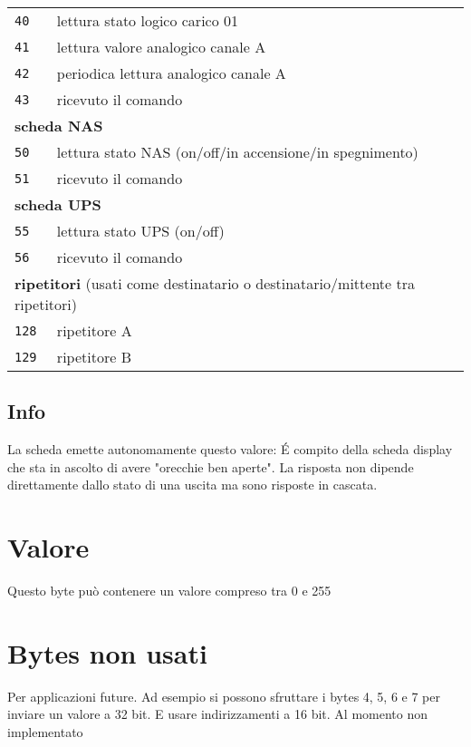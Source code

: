 \documentclass{article}
\begin{document}
\begin{tabular}{ll}
		    \texttt{40} & lettura stato logico carico 01\\ 
		    \texttt{41} & lettura valore analogico canale A\\
		    \texttt{42} & periodica lettura analogico canale A\\
			\texttt{43} & ricevuto il comando\\
			\multicolumn{2}{l}{\textbf{scheda NAS}}\\
			\texttt{50} & lettura stato NAS (on/off/in accensione/in spegnimento)\\
			\texttt{51} & ricevuto il comando\\
			\multicolumn{2}{l}{\textbf{scheda UPS}}\\
			\texttt{55} & lettura stato UPS (on/off)\\
			\texttt{56} & ricevuto il comando\\
			\multicolumn{2}{l}{\textbf{ripetitori} (usati come destinatario o destinatario/mittente tra ripetitori)}\\
			\texttt{128} & ripetitore A\\    
			\texttt{129} & ripetitore B\\ 
        \end{tabular}

    \subsection*{Info}
    
    La scheda emette autonomamente questo valore: \'E compito della scheda display che sta in ascolto di avere "orecchie ben aperte". La risposta non dipende direttamente dallo stato di una uscita ma sono risposte in cascata.
    
    \section*{Valore}
    
    Questo byte può contenere un valore compreso tra 0 e 255
    
    \section*{Bytes non usati}
    
    Per applicazioni future. Ad esempio si possono sfruttare i bytes 4, 5, 6 e 7 per inviare un valore a 32 bit. E usare indirizzamenti a 16 bit. Al momento non implementato
    
\end{document}
